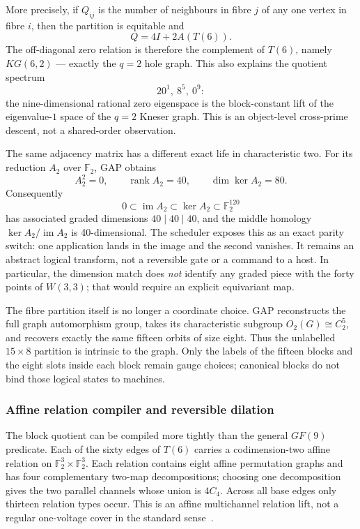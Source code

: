 \documentclass[11pt,letterpaper]{article}
\newcommand{\tagbox}[3]{\tikz[baseline=(X.base)]{\node[inner xsep=3.5pt,inner ysep=1.4pt,rounded corners=1.6pt,fill=#1,text=#2,font=\bfseries\sffamily\tiny] (X) {#3};}}
\newcommand{\PROVED}{\tagbox{greenlite}{green!45!black}{PROVED}}
\newcommand{\W}{\ensuremath{W(3,3)}}
\begin{document}
More precisely, if $Q_{ij}$ is the number of neighbours in fibre $j$ of any
one vertex in fibre $i$, then the partition is equitable and
\[
 Q=4I+2A(T(6)).
\]
The off-diagonal zero relation is therefore the complement of $T(6)$, namely
$KG(6,2)$ --- exactly the $q=2$ hole graph. This also explains the quotient
spectrum
\[
 20^1,\ 8^5,\ 0^9:
\]
the nine-dimensional rational zero eigenspace is the block-constant lift of
the eigenvalue-$1$ space of the $q=2$ Kneser graph. This is an object-level
cross-prime descent, not a shared-order observation. \PROVED

The same adjacency matrix has a different exact life in characteristic two.
For its reduction $A_2$ over $\mathbb F_2$, GAP obtains
\[
 A_2^2=0,\qquad \operatorname{rank}A_2=40,
 \qquad \dim\ker A_2=80.
\]
Consequently
\[
 0\subset\operatorname{im}A_2\subset\ker A_2\subset\mathbb F_2^{120}
\]
has associated graded dimensions $40\mid40\mid40$, and the middle homology
$\ker A_2/\operatorname{im}A_2$ is 40-dimensional. The scheduler exposes this
as an exact parity switch: one application lands in the image and the second
vanishes. It remains an abstract logical transform, not a reversible gate or
a command to a host. In particular, the dimension match does \emph{not}
identify any graded piece with the forty points of \W{}; that would require an
explicit equivariant map. \PROVED

The fibre partition itself is no longer a coordinate choice. GAP reconstructs
the full graph automorphism group, takes its characteristic subgroup
$O_2(G)\cong C_2^5$, and recovers exactly the same fifteen orbits of size eight.
Thus the unlabelled $15\times8$ partition is intrinsic to the graph. Only the
labels of the fifteen blocks and the eight slots inside each block remain gauge
choices; canonical blocks do not bind those logical states to machines.
\PROVED

\subsubsection{Affine relation compiler and reversible dilation}

The block quotient can be compiled more tightly than the general $GF(9)$
predicate. Each of the sixty edges of $T(6)$ carries a codimension-two affine
relation on $\mathbb F_2^3\times\mathbb F_2^3$. Each relation contains eight
affine permutation graphs and has four complementary two-map decompositions;
choosing one decomposition gives the two parallel channels whose union is
$4C_4$. Across all base edges only thirteen relation types occur. This is an
affine multichannel relation lift, not a regular one-voltage cover in the
standard sense~\cite{gross1977coverings}. \PROVED
\end{document}
